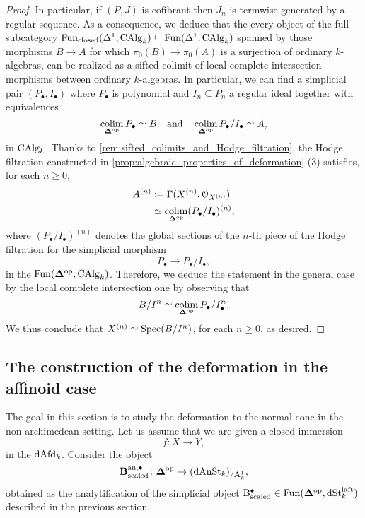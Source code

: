 \documentclass[10pt,a4paper,reqno]{amsart} %
\theoremstyle{plain}
\theoremstyle{definition}
\theoremstyle{remark}
\numberwithin{equation}{section}
\begin{document}
\begin{proof}
     In particular, if $(P, J)$ is cofibrant then $J_n$ is termwise
     generated by a regular sequence.
     As a consequence, we deduce that the every object of the full subcategory $\operatorname{Fun}_{\mathrm{closed}}(\Delta^1, \mathrm{CAlg}_k) \subseteq \operatorname{Fun}(\Delta^1, \mathrm{CAlg}_k)$
    spanned by those morphisms $B \to A$ for which $\pi_0(B) \to \pi_0(A)$ is a surjection of ordinary $k$-algebras, can be realized as a sifted colimit of local complete intersection
    morphisms between ordinary $k$-algebras. In particular, we can find a simplicial pair $(P_\bullet, I_\bullet)$ where $P_\bullet$ is polynomial and $I_n \subseteq P_n$ a regular ideal
    together with equivalences
        \[
            \operatorname*{colim}_{\bm{\Delta} ^\mathrm{op}} P_\bullet \simeq B \quad \mathrm{and} \quad \operatorname*{colim}_{\bm{\Delta} ^\mathrm{op}} P_\bullet/ I_\bullet \simeq A,  
        \]
    in $\mathrm{CAlg}_k$. Thanks to \cref{rem:sifted_colimits_and_Hodge_filtration}, the Hodge filtration constructed in \cref{prop:algebraic_properties_of_deformation} (3)
    satisfies, for each $n \ge 0$,
        \begin{align*}
            A^{(n)} & \coloneqq \Gamma(X^{(n)}, \mathcal O_{X^{(n)}}) \\
                    & \simeq  \operatorname*{colim}_{\bm{\Delta} ^\mathrm{op}} (P_{\bullet}/I_\bullet)^{(n)},
        \end{align*}
    where $(P_\bullet/ I_\bullet)^{(n)}$ denotes the global sections of the $n$-th piece of the Hodge filtration for the simplicial morphism
        \[
            P_\bullet \to P_\bullet/ I_\bullet,  
        \]
    in the \infcat $\operatorname{Fun}(\bm{\Delta} ^\mathrm{op}, \mathrm{CAlg}_k)$. Therefore,
    we deduce the statement in the general case by the local complete intersection one by observing that
        \[
            B/ I^n \simeq \operatorname*{colim}_{\bm{\Delta} ^\mathrm{op}} P_\bullet / I^n_\bullet.
        \]
    We thus conclude that $X^{(n)} \simeq \operatorname{Spec}(B/ I^n)$, for each $n \ge 0$, as desired.
\end{proof}

\subsection{The construction of the deformation in the affinoid case} The goal in this section is to study the deformation to the normal cone in the non-archimedean
setting. Let us assume that we are given a closed immersion
    \[
        f \colon X \to Y,
    \]  
in the \infcat $\mathrm{dAfd}_k$. Consider the object
    \[
        \mathbf{B}^{\mathrm{an}, \bullet}_{\mathrm{scaled}} \colon \bm{\Delta} ^\mathrm{op} \to (\mathrm{dAnSt}_k)_{/ \mathbf A^1_k},
    \]
obtained as the analytification of the simplicial object $\mathrm{B}^\bullet_{\mathrm{scaled}} \in \operatorname{Fun}(\bm{\Delta} ^\mathrm{op}, \mathrm{dSt}^{\mathrm{laft}}_k)$ described in the previous section.
\end{document}
